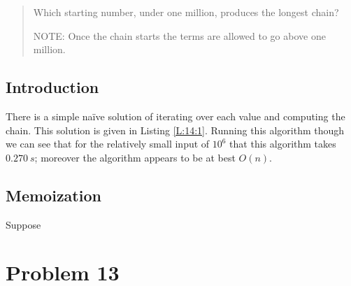 \documentclass[oneside,12pt]{book}   	%
\newcounter{ex}
\newcounter{pr}
\theoremstyle{definition}
\begin{document}
\begin{spacing}{1.618}
\begin{quote}
			Which starting number, under one million, produces the longest chain?

			NOTE: Once the chain starts the terms are allowed to go above one million.
		\end{quote}
		
	\section{Introduction}
	
		There is a simple na\"ive solution of iterating over each value and computing the chain. This solution is given in Listing \ref{L:14:1}. Running this algorithm though we can see that for the relatively small input of $10^6$ that this algorithm takes $0.270~s$; moreover the algorithm appears to be at best $O(n)$. 

		
	
	\section{Memoization}
		Suppose
	
			
	
	
\appendix

	\chapter{Problem 13}\label{A:P:13}
	

\end{spacing}
\end{document}
